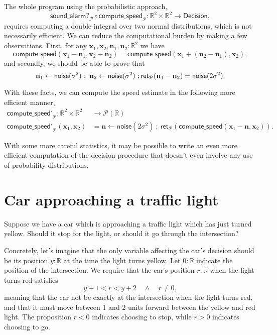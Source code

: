 \documentclass{article}           %
\newcommand{\R}{\mathbb{R}}
\newcommand{\Prob}{\mathcal{P}}
\newcommand{\ret}[1]{\mathsf{ret}_{#1}}
\newcommand{\ve}[1]{\mathbf{#1}}
\newcommand{\then}{\ ;\ }
\begin{document}
The whole program using the probabilistic approach,
\[
\mathsf{sound\_alarm?}_\Prob \circ \mathsf{compute\_speed}_\Prob : \R^2 \times \R^2 \to \mathsf{Decision},
\]
requires computing a double integral over two normal distributions, which is not necessarily efficient. We can reduce the computational burden by making a few observations. First, for any $\ve{x}_1, \ve{x}_2, \ve{n}_1, \ve{n}_2 : \R^2 $ we have
\[
\mathsf{compute\_speed}(\ve{x}_1 - \ve{n}_1, \ve{x}_2 - \ve{n}_2)
= 
\mathsf{compute\_speed}(\ve{x}_1  + (\ve{n}_2 - \ve{n}_1), \ve{x}_2),
\]
and secondly, we should be able to prove that
\[
  \ve{n}_1 \leftarrow \mathsf{noise}(\sigma^2)
  \then
  \ve{n}_2 \leftarrow \mathsf{noise}(\sigma^2)
  \then
  \\ \ret{\Prob}(\ve{n}_1 - \ve{n}_2)
= \mathsf{noise}(2\sigma^2).
\]

With these facts, we can compute the speed estimate in the following more efficient manner,
\begin{align*}
\mathsf{compute\_speed'}_\Prob : \R^2 \times \R^2 &\to \Prob(\R)
\\ \mathsf{compute\_speed'}_\Prob (\ve{x}_1, \ve{x}_2) &= 
  \ve{n} \leftarrow \mathsf{noise}(2 \sigma^2)
  \then
  \ret{\Prob} \left( \mathsf{compute\_speed}(\ve{x}_1 - \ve{n}, \ve{x}_2) \right).
\end{align*}

With some more careful statistics, it may be possible to write an even more efficient computation of the decision procedure that doesn't even involve any use of probability distributions.

\section{Car approaching a traffic light}

Suppose we have a car which is approaching a traffic light which has just turned yellow. Should it stop for the light, or should it go through the intersection?

Concretely, let's imagine that the only variable affecting the car's decision should be its position $y : \R$ at the time the light turns yellow. Let $0 : \R$ indicate the position of the intersection. We require that the car's position $r : \R$ when the light turns red satisfies
\[
y + 1< r < y + 2 \quad \wedge \quad r \ne 0,
\]
meaning that the car not be exactly at the intersection when the light turns red, and that it must move between 1 and 2 units forward between the yellow and red light. The proposition $r < 0$ indicates choosing to stop, while $r >0$ indicates choosing to go.
\end{document}
